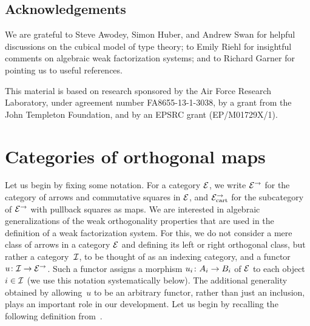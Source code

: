 \documentclass[reqno,10pt,a4paper,oneside,draft]{amsart}
\begin{document}
\subsection*{Acknowledgements}
We are grateful to Steve Awodey, Simon Huber, and Andrew Swan for helpful discussions on the cubical model of type theory; to Emily Riehl for insightful comments on algebraic weak factorization systems; and to Richard Garner for pointing us to useful references.

This material is based on research sponsored by the Air Force Research Laboratory, under agreement number FA8655-13-1-3038, by a grant from the John Templeton Foundation, and by an EPSRC grant (EP/M01729X/1).





\section{Categories of orthogonal maps}
\label{sec:ortf}

Let us begin by fixing some notation. For a category $\catE$, we write $\cal{E}^\to$ for the category of arrows and commutative squares in $\cal{E}$, and $\cal{E}^\to_{\cart}$ for the
subcategory of $\cal{E}^\to$ with pullback squares as maps. 
We are interested in algebraic generalizations of the weak orthogonality properties that are used in the definition of a weak factorization system. For this, we do not consider a mere class of arrows in a category $\catE$ and defining its left or right orthogonal class, but rather a category~$\cal{I}$, to be thought of as an indexing category, and a functor~$u \co \cal{I} \to \catE^\to$.
Such a functor assigns a morphism $u_i \co A_i \to B_i$ of $\catE$ to each object~$i \in \cal{I}$ (we  use this notation systematically below).
The additional generality obtained by allowing~$u$ to be an arbitrary functor, rather than just an inclusion,  plays an important role in our development.
Let us begin by recalling the following definition from~\cite{garner:small-object-argument}.
\end{document}
